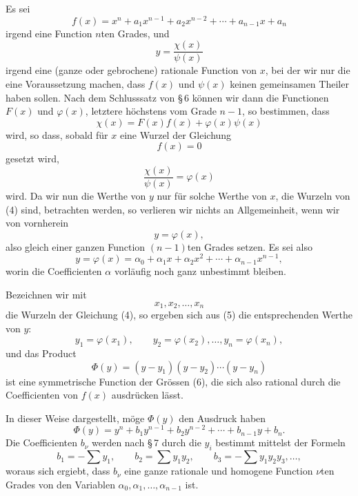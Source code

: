 \documentclass[11pt]{article}
\begin{document}
Es sei
\begin{equation}
f(x)=x^n+a_1x^{n-1}+a_2x^{n-2}+\cdots+a_{n-1}x+a_n
\tag{1}
\end{equation}
irgend eine Function $n$ten Grades, und
\begin{equation}
y=\frac{\chi(x)}{\psi(x)}
\tag{2}
\end{equation}
irgend eine (ganze oder gebrochene) rationale Function von $x$, bei der wir nur die eine Voraussetzung machen, dass $f(x)$ und $\psi(x)$ keinen gemeinsamen Theiler haben sollen. Nach dem Schlusssatz von \S\,6 können wir dann die Functionen $F(x)$ und $\varphi(x)$, letztere höchstens vom Grade $n-1$, so bestimmen, dass
\begin{equation}
\chi(x)=F(x)f(x)+\varphi(x)\psi(x)
\tag{3}
\end{equation}
wird, so dass, sobald für $x$ eine Wurzel der Gleichung
\begin{equation}
f(x)=0
\tag{4}
\end{equation}
gesetzt wird,
\[
\frac{\chi(x)}{\psi(x)}=\varphi(x)
\]
wird. Da wir nun die Werthe von $y$ nur für solche Werthe von $x$, die Wurzeln von (4) sind, betrachten werden, so verlieren wir nichts an Allgemeinheit, wenn wir von vornherein
\[
y=\varphi(x),
\]
also gleich einer ganzen Function $(n-1)$ten Grades setzen. Es sei also
\begin{equation}
y=\varphi(x)=\alpha_0+\alpha_1x+\alpha_2x^2+\cdots+\alpha_{n-1}x^{n-1},
\tag{5}
\end{equation}
worin die Coefficienten $\alpha$ vorläufig noch ganz unbestimmt bleiben.

Bezeichnen wir mit
\begin{equation}
x_1,x_2,\ldots,x_n
\tag{6}
\end{equation}
die Wurzeln der Gleichung (4), so ergeben sich aus (5) die entsprechenden Werthe von $y$:
\begin{equation}
y_1=\varphi(x_1),\qquad y_2=\varphi(x_2),\ldots, y_n=\varphi(x_n),
\tag{7}
\end{equation}
und das Product
\begin{equation}
\Phi(y)=(y-y_1)(y-y_2)\cdots(y-y_n)
\tag{8}
\end{equation}
ist eine symmetrische Function der Grössen (6), die sich also rational durch die Coefficienten von $f(x)$ ausdrücken lässt.

In dieser Weise dargestellt, möge $\Phi(y)$ den Ausdruck haben
\begin{equation}
\Phi(y)=y^n+b_1y^{n-1}+b_2y^{n-2}+\cdots+b_{n-1}y+b_n.
\tag{9}
\end{equation}
Die Coefficienten $b_\nu$ werden nach \S\,7 durch die $y_i$ bestimmt mittelst der Formeln
\[
b_1=-\sum y_1,
\qquad
b_2=\sum y_1y_2,
\qquad
b_3=-\sum y_1y_2y_3,\ldots,
\]
woraus sich ergiebt, dass $b_\nu$ eine ganze rationale und homogene Function $\nu$ten Grades von den Variablen $\alpha_0,\alpha_1,\ldots,\alpha_{n-1}$ ist.
\end{document}
